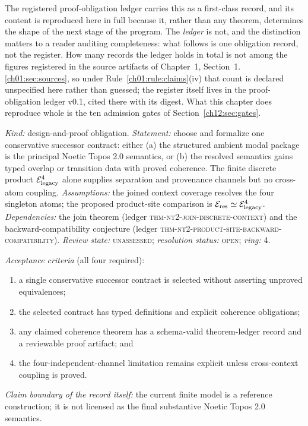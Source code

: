 The registered proof-obligation ledger carries this as a first-class
record, and its content is reproduced here in full because it, rather than
any theorem, determines the shape of the next stage of the program. The
\emph{ledger} is not, and the distinction matters to a reader auditing
completeness: what follows is one obligation record, not the register. How many records the ledger holds in total is not among the
figures registered in the source artifacts of Chapter~1,
Section~1.\ref{ch01:sec:sources}, so under Rule~\ref{ch01:rule:claims}(iv)
that count is declared unspecified here rather than guessed; the register
itself lives in the proof-obligation ledger v0.1, cited there with its
digest. What this chapter does reproduce whole is the ten admission gates
of Section~\ref{ch12:sec:gates}.

\begin{invariant}
\label{ch12:inv:obligation}
\emph{Kind:} design-and-proof obligation. \emph{Statement:} choose and
formalize one conservative successor contract: either (a) the structured
ambient modal package is the principal Noetic Topos 2.0 semantics, or (b)
the resolved semantics gains typed overlap or transition data with proved
coherence. The finite discrete product $\mathcal{E}_{\mathrm{legacy}}^4$ alone supplies separation
and provenance channels but no cross-atom coupling. \emph{Assumptions:} the
joined context coverage resolves the four singleton atoms; the proposed
product-site comparison is $\mathcal{E}_{\mathrm{res}} \simeq \mathcal{E}_{\mathrm{legacy}}^4$. \emph{Dependencies:} the
join theorem (ledger \textsc{thm-nt2-join-discrete-context}) and the
backward-compatibility conjecture (ledger
\textsc{thm-nt2-product-site-backward-compatibility}). \emph{Review state:}
\textsc{unassessed}; \emph{resolution status:} \textsc{open}; \emph{ring:}
4.

\emph{Acceptance criteria} (all four required):
\begin{enumerate}
\item a single conservative successor contract is selected without
asserting unproved equivalences;
\item the selected contract has typed definitions and explicit coherence
obligations;
\item any claimed coherence theorem has a schema-valid theorem-ledger
record and a reviewable proof artifact; and
\item the four-independent-channel limitation remains explicit unless
cross-context coupling is proved.
\end{enumerate}
\emph{Claim boundary of the record itself:} the current finite model is a
reference construction; it is not licensed as the final substantive Noetic
Topos 2.0 semantics.
\end{invariant}

